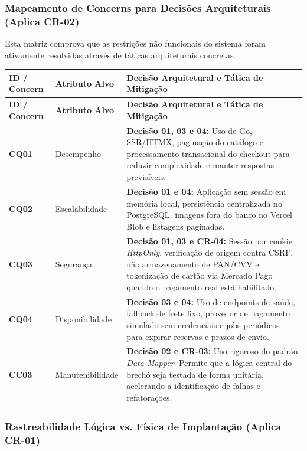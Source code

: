 ﻿\documentclass[12pt,a4paper]{article}
\begin{document}
\subsubsection{Mapeamento de Concerns para Decisões Arquiteturais (Aplica CR-02)}

Esta matriz comprova que as restrições não funcionais do sistema foram ativamente resolvidas através de táticas arquiteturais concretas.

\begin{longtable}{|p{2cm}|p{3.5cm}|p{8.5cm}|}
\hline
\textbf{ID / Concern} & \textbf{Atributo Alvo} & \textbf{Decisão Arquitetural e Tática de Mitigação} \\
\hline
\endfirsthead
\hline
\textbf{ID / Concern} & \textbf{Atributo Alvo} & \textbf{Decisão Arquitetural e Tática de Mitigação} \\
\hline
\endhead
\textbf{CQ01} & Desempenho & \textbf{Decisão 01, 03 e 04:} Uso de Go, SSR/HTMX, paginação do catálogo e processamento transacional do checkout para reduzir complexidade e manter respostas previsíveis. \\
\hline
\textbf{CQ02} & Escalabilidade & \textbf{Decisão 01 e 04:} Aplicação sem sessão em memória local, persistência centralizada no PostgreSQL, imagens fora do banco no Vercel Blob e listagens paginadas. \\
\hline
\textbf{CQ03} & Segurança & \textbf{Decisão 01, 03 e CR-04:} Sessão por cookie \textit{HttpOnly}, verificação de origem contra CSRF, não armazenamento de PAN/CVV e tokenização de cartão via Mercado Pago quando o pagamento real está habilitado. \\
\hline
\textbf{CQ04} & Disponibilidade & \textbf{Decisão 03 e 04:} Uso de endpoints de saúde, fallback de frete fixo, provedor de pagamento simulado sem credenciais e jobs periódicos para expirar reservas e prazos de envio. \\
\hline
\textbf{CC03} & Manutenibilidade & \textbf{Decisão 02 e CR-03:} Uso rigoroso do padrão \textit{Data Mapper}. Permite que a lógica central do brechó seja testada de forma unitária, acelerando a identificação de falhas e refatorações. \\
\hline
\end{longtable}

\subsubsection{Rastreabilidade Lógica vs. Física de Implantação (Aplica CR-01)}
\end{document}
